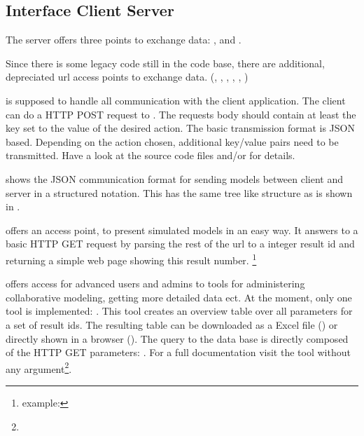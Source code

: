 \subsection{Interface Client Server}
\label{sec:iface_c_s}

The server offers three points to exchange data: ,  and .

Since there is some legacy code still in the code base, there are additional, depreciated url access points to exchange data. (, , , , , )

 is supposed to handle all communication with the client application.
The client can do a HTTP POST request to \splurl[api].
The requests body should contain at least the key  set to the value of the desired action.
The basic transmission format is JSON based.
Depending on the action chosen, additional key/value pairs need to be transmitted.
Have a look at the source code files  and/or  for details.





 shows the JSON communication format for sending models between client and server in a structured notation. This has the same tree like structure as is shown in .


 offers an access point, to present simulated models in an easy way.
It answers to a basic HTTP GET request by parsing the rest of the url to a integer result id and returning a simple web page showing this result number.
\splurl[<result-id>]\footnote{example: \splurl[1337]}


 offers access for advanced users and admins to tools for administering collaborative modeling, getting more detailed data ect.
At the moment, only one tool is implemented: .
This tool creates an overview table over all parameters for a set of result ids.
The resulting table can be downloaded as a Excel file () or directly shown in a browser ().
The query to the data base is directly composed of the HTTP GET parameters:
\splurl[tools/ResultDataTable?6696,6904-7000\&type=html].
For a full documentation visit the tool without any argument\footnote{}.






